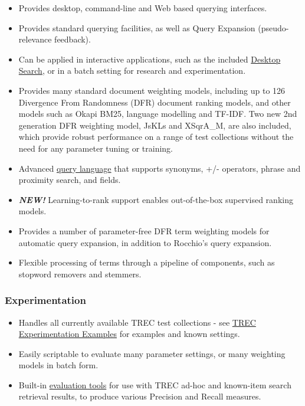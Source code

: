 \begin{itemize}
\tightlist
\item
  Provides desktop, command-line and Web based querying interfaces.
\item
  Provides standard querying facilities, as well as Query Expansion
  (pseudo-relevance feedback).
\item
  Can be applied in interactive applications, such as the included
  \href{terrier_desktop.html}{Desktop Search}, or in a batch setting for
  research and experimentation.
\item
  Provides many standard document weighting models, including up to 126
  Divergence From Randomness (DFR) document ranking models, and other
  models such as Okapi BM25, language modelling and TF-IDF. Two new 2nd
  generation DFR weighting model, JsKLs and XSqrA\_M, are also included,
  which provide robust performance on a range of test collections
  without the need for any parameter tuning or training.
\item
  Advanced \href{querylanguage.html}{query language} that supports
  synonyms, +/- operators, phrase and proximity search, and fields.
\item
  \emph{\textbf{NEW!}} Learning-to-rank support enables out-of-the-box
  supervised ranking models.
\item
  Provides a number of parameter-free DFR term weighting models for
  automatic query expansion, in addition to Rocchio's query expansion.
\item
  Flexible processing of terms through a pipeline of components, such as
  stopword removers and stemmers.
\end{itemize}

\subsubsection{Experimentation}\label{experimentation}

\begin{itemize}
\tightlist
\item
  Handles all currently available TREC test collections - see
  \href{trec_examples.html}{TREC Experimentation Examples} for examples
  and known settings.
\item
  Easily scriptable to evaluate many parameter settings, or many
  weighting models in batch form.
\item
  Built-in \href{evaluation.html}{evaluation tools} for use with TREC
  ad-hoc and known-item search retrieval results, to produce various
  Precision and Recall measures.
\end{itemize}

